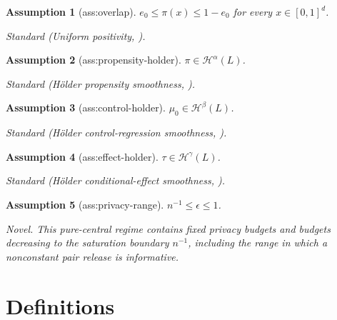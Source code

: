 \documentclass{article}
\newtheorem{assumption}{Assumption}
\begin{document}
\begin{assumption}[ass:overlap]\label{ass:overlap}
\(e_0\le\pi(x)\le1-e_0\) for every \(x\in[0,1]^d\).
\par\smallskip\noindent\emph{Standard} (Uniform positivity, \cite{kennedy2024minimax}).
\end{assumption}

\begin{assumption}[ass:propensity-holder]\label{ass:propensity-holder}
\(\pi\in\mathcal H^\alpha(L)\).
\par\smallskip\noindent\emph{Standard} (Hölder propensity smoothness, \cite{kennedy2024minimax}).
\end{assumption}

\begin{assumption}[ass:control-holder]\label{ass:control-holder}
\(\mu_0\in\mathcal H^\beta(L)\).
\par\smallskip\noindent\emph{Standard} (Hölder control-regression smoothness, \cite{kennedy2024minimax}).
\end{assumption}

\begin{assumption}[ass:effect-holder]\label{ass:effect-holder}
\(\tau\in\mathcal H^\gamma(L)\).
\par\smallskip\noindent\emph{Standard} (Hölder conditional-effect smoothness, \cite{kennedy2024minimax}).
\end{assumption}

\begin{assumption}[ass:privacy-range]\label{ass:privacy-range}
\(n^{-1}\le\epsilon\le1\).
\par\smallskip\noindent\emph{Novel.} This pure-central regime contains fixed privacy budgets and budgets decreasing to the saturation boundary \(n^{-1}\), including the range in which a nonconstant pair release is informative.
\end{assumption}

\section{Definitions}
\end{document}
